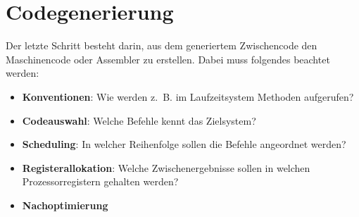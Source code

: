 \section{Codegenerierung}
Der letzte Schritt besteht darin, aus dem generiertem Zwischencode den 
Maschinencode oder Assembler zu erstellen. Dabei muss folgendes beachtet werden:
\begin{itemize}
    \item \textbf{Konventionen}: Wie werden z.~B. im Laufzeitsystem Methoden aufgerufen?
    \item \textbf{Codeauswahl}: Welche Befehle kennt das Zielsystem?
    \item \textbf{Scheduling}: In welcher Reihenfolge sollen die Befehle angeordnet werden?
    \item \textbf{Registerallokation}: Welche Zwischenergebnisse sollen in welchen Prozessorregistern gehalten werden?
    \item \textbf{Nachoptimierung}
\end{itemize}

